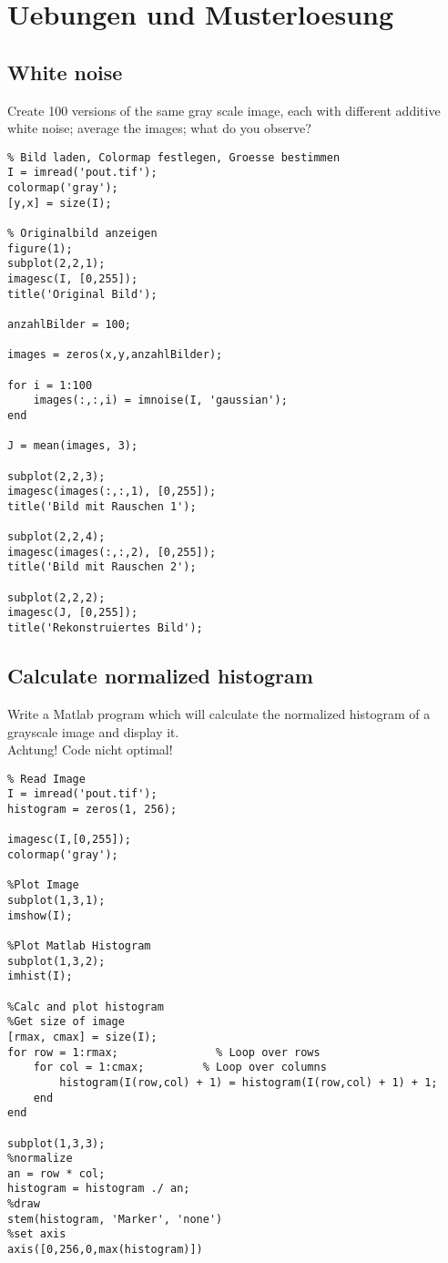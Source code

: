 \section{Uebungen und Musterloesung}
\lstset{style=Matlab}
\subsection{White noise}
Create 100 versions of the same gray scale image, each with different additive
white noise; average the images; what do you observe?
\begin{lstlisting}
% Bild laden, Colormap festlegen, Groesse bestimmen
I = imread('pout.tif');
colormap('gray');
[y,x] = size(I);

% Originalbild anzeigen
figure(1);
subplot(2,2,1);
imagesc(I, [0,255]);
title('Original Bild');

anzahlBilder = 100;

images = zeros(x,y,anzahlBilder);

for i = 1:100
    images(:,:,i) = imnoise(I, 'gaussian');
end

J = mean(images, 3);

subplot(2,2,3);
imagesc(images(:,:,1), [0,255]);
title('Bild mit Rauschen 1');

subplot(2,2,4);
imagesc(images(:,:,2), [0,255]);
title('Bild mit Rauschen 2');

subplot(2,2,2);
imagesc(J, [0,255]);
title('Rekonstruiertes Bild');
\end{lstlisting}
\subsection{Calculate normalized histogram}
Write a Matlab program which will calculate the normalized histogram of a
grayscale image and display it. \\
Achtung! Code nicht optimal!
\begin{lstlisting}
% Read Image
I = imread('pout.tif');
histogram = zeros(1, 256);

imagesc(I,[0,255]);
colormap('gray');

%Plot Image
subplot(1,3,1);
imshow(I);

%Plot Matlab Histogram
subplot(1,3,2);
imhist(I);

%Calc and plot histogram
%Get size of image
[rmax, cmax] = size(I);
for row = 1:rmax;               % Loop over rows
    for col = 1:cmax;         % Loop over columns
        histogram(I(row,col) + 1) = histogram(I(row,col) + 1) + 1;
    end
end

subplot(1,3,3);
%normalize
an = row * col;
histogram = histogram ./ an;
%draw
stem(histogram, 'Marker', 'none')
%set axis
axis([0,256,0,max(histogram)])
\end{lstlisting}
